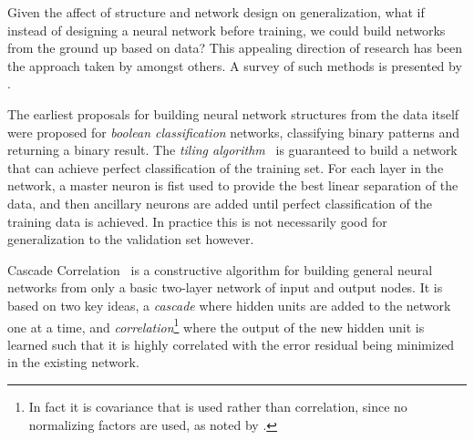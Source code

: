 \documentclass[thesis]{subfiles}
\begin{document}
	Given the affect of structure and network design on generalization, what if instead of designing a neural network before training, we could build networks from the ground up based on data? This appealing direction of research has been the approach taken by \citet{mezard1989learning,Fahlman1989,MacKay91,mackay1992practical,hypernetworks} amongst others. A survey of such methods is presented by \citet{parekh2000constructive}.
	
	The earliest proposals for building neural network structures from the data itself were proposed for \emph{boolean classification} networks, \ie classifying binary patterns and returning a binary result. The \emph{tiling algorithm}~\citep{mezard1989learning} is guaranteed to build a network that can achieve perfect classification of the training set. For each layer in the network, a master neuron is fist used to provide the best linear separation of the data, and then ancillary neurons are added until perfect classification of the training data is achieved. In practice this is not necessarily good for generalization to the validation set however. 
	
	Cascade Correlation~\citep{Fahlman1989} is a constructive algorithm for building general neural networks from only a basic two-layer network of input and output nodes. It is based on two key ideas, a \emph{cascade} where hidden units are added to the network one at a time, and \emph{correlation}\footnote{In fact it is covariance that is used rather than correlation, since no normalizing factors are used, as noted by \citet{Fahlman1989}.} where the output of the new hidden unit is learned such that it is highly correlated with the error residual being minimized in the existing network.
	
\end{document}
